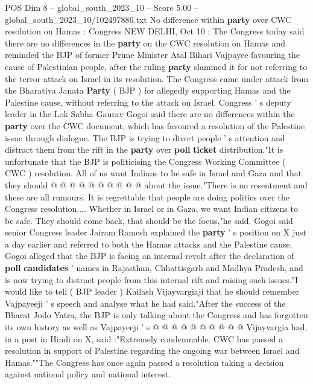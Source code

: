 \begin{textsample}{POS Dim 8 – global\_south\_2023\_10 – Score 5.00 – global\_south\_2023\_10/102497886.txt}  \label{ex:f8_pos_362}
No difference within \textbf{party} over CWC resolution on Hamas : Congress NEW DELHI, Oct 10 : The Congress today said there are no differences in the \textbf{party} on the CWC resolution on Hamas and reminded the BJP of former Prime Minister Atal Bihari Vajpayee favouring the cause of Palestinian people, after the ruling \textbf{party} slammed it for not referring to the terror attack on Israel in its resolution.
The Congress came under attack from the Bharatiya Janata \textbf{Party} ( BJP ) for allegedly supporting Hamas and the Palestine cause, without referring to the attack on Israel.
Congress ' s deputy leader in the Lok Sabha Gaurav Gogoi said there are no differences within the \textbf{party} over the CWC document, which has favoured a resolution of the Palestine issue through dialogue.
The BJP is trying to divert people ' s attention and distract them from the rift in the \textbf{party} over \textbf{poll} \textbf{ticket} distribution."It is unfortunate that the BJP is politicising the Congress Working Committee ( CWC ) resolution.
All of us want Indians to be safe in Israel and Gaza and that they should @ @ @ @ @ @ @ @ @ @ about the issue."There is no resentment and these are all rumours.
It is regrettable that people are doing politics over the Congress resolution....
Whether in Israel or in Gaza, we want Indian citizens to be safe.
They should come back, that should be the focus,"he said.
Gogoi said senior Congress leader Jairam Ramesh explained the \textbf{party} ' s position on X just a day earlier and referred to both the Hamas attacks and the Palestine cause.
Gogoi alleged that the BJP is facing an internal revolt after the declaration of \textbf{poll} \textbf{candidates} ' names in Rajasthan, Chhattisgarh and Madhya Pradesh, and is now trying to distract people from this internal rift and raising such issues."I would like to tell ( BJP leader ) Kailash Vijayvargiaji that he should remember Vajpayeeji ' s speech and analyse what he had said."After the success of the Bharat Jodo Yatra, the BJP is only talking about the Congress and has forgotten its own history as well as Vajpayeeji ' s @ @ @ @ @ @ @ @ @ @ Vijayvargia had, in a post in Hindi on X, said :"Extremely condemnable.
CWC has passed a resolution in support of Palestine regarding the ongoing war between Israel and Hamas.""The Congress has once again passed a resolution taking a decision against national policy and national interest.

\end{textsample}
